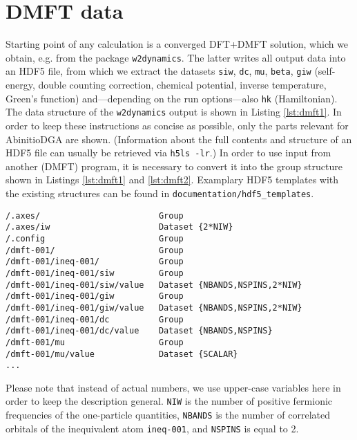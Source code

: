 \documentclass[a4paper,11pt]{article}
\numberwithin{equation}{section} %
\begin{document}
\section{DMFT data}
Starting point of any calculation is a converged DFT+DMFT solution, which we obtain, e.g. from the package 
\verb|w2dynamics|. The latter writes all output data into an HDF5 file, from which we extract the datasets \verb|siw|, \verb|dc|, \verb|mu|, 
\verb|beta|, \verb|giw| (self-energy, double counting correction, chemical potential, inverse temperature, Green's function)
and---depending on the run options---also \verb|hk| (Hamiltonian).
The data structure of the \verb|w2dynamics| output is shown in Listing \ref{lst:dmft1}.
In order to keep these instructions as concise as possible, only the parts relevant for AbinitioDGA are shown.
(Information about the full contents and structure of an HDF5 file can usually be retrieved via  \verb|h5ls -lr|.) In order to use
input from another (DMFT) program, it is necessary to convert it into the group structure 
shown in Listings \ref{lst:dmft1} and \ref{lst:dmft2}. 
Examplary HDF5 templates with the existing structures can be found in {\color{blue}\verb+documentation/hdf5_templates+}.
\newpage
\begin{lstlisting}[caption=HDF5-structure of the DMFT output, frame=single, basicstyle=\small, label={lst:dmft1}]
/.axes/                        Group
/.axes/iw                      Dataset {2*NIW}
/.config                       Group
/dmft-001/                     Group
/dmft-001/ineq-001/            Group
/dmft-001/ineq-001/siw         Group
/dmft-001/ineq-001/siw/value   Dataset {NBANDS,NSPINS,2*NIW}
/dmft-001/ineq-001/giw         Group
/dmft-001/ineq-001/giw/value   Dataset {NBANDS,NSPINS,2*NIW}
/dmft-001/ineq-001/dc          Group
/dmft-001/ineq-001/dc/value    Dataset {NBANDS,NSPINS}
/dmft-001/mu                   Group
/dmft-001/mu/value             Dataset {SCALAR}
...
\end{lstlisting}
Please note that instead of actual numbers, we use upper-case variables here in order to keep
the description general. \verb|NIW| is the number of positive fermionic frequencies of the one-particle quantities,
\verb|NBANDS| is the number of correlated orbitals of the inequivalent atom \verb|ineq-001|, and \verb|NSPINS| is equal to 2.
\end{document}
